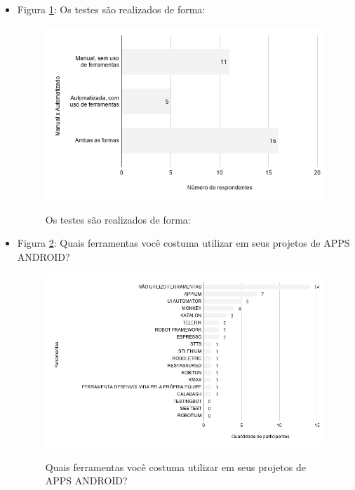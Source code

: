 \begin{itemize}
    
     \item Figura \ref{figure:s_formatestes}: Os testes são realizados de forma:
    \begin{figure}[!htb]
    \centering
    \includegraphics[width=.80\textwidth]{images/s_formatestes.png}
    \label{figure:s_formatestes}
    \caption{Os testes são realizados de forma:}
    \end{figure}    
    
    
    \item Figura \ref{figure:s_ferramentastestes}: Quais ferramentas você costuma utilizar em seus projetos de APPS ANDROID?
    \begin{figure}[!htb]
    \centering
    \includegraphics[width=.80\textwidth]{images/s_ferramentastestes.png}
    \label{figure:s_ferramentastestes}
    \caption{Quais ferramentas você costuma utilizar em seus projetos de APPS ANDROID?}
    \end{figure}
    

\end{itemize}
